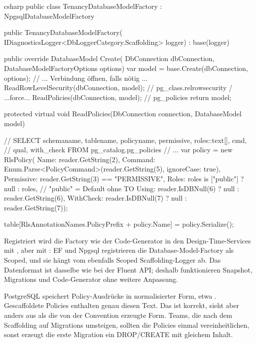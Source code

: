 \begin{sourcecode}{csharp}
public class TenancyDatabaseModelFactory : NpgsqlDatabaseModelFactory
{
    public TenancyDatabaseModelFactory(
        IDiagnosticsLogger<DbLoggerCategory.Scaffolding> logger)
        : base(logger)
    {
    }

    public override DatabaseModel Create(
        DbConnection dbConnection, DatabaseModelFactoryOptions options)
    {
        var model = base.Create(dbConnection, options);
        // ... Verbindung öffnen, falls nötig ...
        ReadRowLevelSecurity(dbConnection, model);    // pg_class.relrowsecurity / ...force...
        ReadPolicies(dbConnection, model);            // pg_policies
        return model;
    }

    protected virtual void ReadPolicies(DbConnection connection, DatabaseModel model)
    {
        // SELECT schemaname, tablename, policyname, permissive, roles::text[], cmd,
        //        qual, with_check FROM pg_catalog.pg_policies
        // ...
        var policy = new RlsPolicy(
            Name: reader.GetString(2),
            Command: Enum.Parse<PolicyCommand>(reader.GetString(5), ignoreCase: true),
            Permissive: reader.GetString(3) == "PERMISSIVE",
            Roles: roles is ["public"] ? null : roles,    // "public" = Default ohne TO
            Using: reader.IsDBNull(6) ? null : reader.GetString(6),
            WithCheck: reader.IsDBNull(7) ? null : reader.GetString(7));

        table[RlsAnnotationNames.PolicyPrefix + policy.Name] = policy.Serialize();
    }
}
\end{sourcecode}

Registriert wird die Factory wie der Code-Generator in den Design-Time-Services mit
, aber mit : EF und Npgsql
registrieren die Database-Model-Factory als Scoped, und sie hängt vom ebenfalls Scoped
Scaffolding-Logger ab. Das Datenformat ist dasselbe wie bei der Fluent API; deshalb funktionieren Snapshot, Migrations und
Code-Generator ohne weitere Anpassung.

\begin{note}
  PostgreSQL speichert Policy-Ausdrücke in normalisierter Form, etwa
  . Gescaffoldete Policies enthalten genau diesen
  Text. Das ist korrekt, sieht aber anders aus als die von der Convention erzeugte Form.
  Teams, die nach dem Scaffolding auf Migrations umsteigen, sollten die Policies einmal
  vereinheitlichen, sonst erzeugt die erste Migration ein DROP/CREATE mit gleichem Inhalt.
\end{note}

